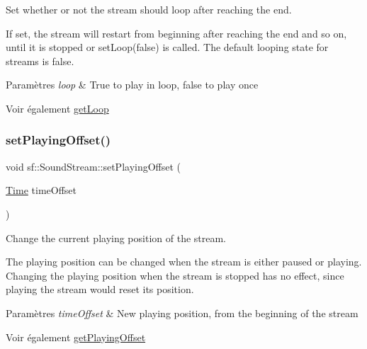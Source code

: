 Set whether or not the stream should loop after reaching the end. 

If set, the stream will restart from beginning after reaching the end and so on, until it is stopped or set\+Loop(false) is called. The default looping state for streams is false.


\begin{DoxyParams}{Paramètres}
{\em loop} & True to play in loop, false to play once\\
\hline
\end{DoxyParams}
\begin{DoxySeeAlso}{Voir également}
\hyperlink{classsf_1_1SoundStream_a49d263f9bbaefec4b019bd05fda59b25}{get\+Loop} 
\end{DoxySeeAlso}
\mbox{\label{classsf_1_1SoundStream_af416a5f84c8750d2acb9821d78bc8646}} 
\subsubsection{\texorpdfstring{set\+Playing\+Offset()}{setPlayingOffset()}}
{\footnotesize\ttfamily void sf\+::\+Sound\+Stream\+::set\+Playing\+Offset (\begin{DoxyParamCaption}\item[{\hyperlink{classsf_1_1Time}{Time}}]{time\+Offset }\end{DoxyParamCaption})}



Change the current playing position of the stream. 

The playing position can be changed when the stream is either paused or playing. Changing the playing position when the stream is stopped has no effect, since playing the stream would reset its position.


\begin{DoxyParams}{Paramètres}
{\em time\+Offset} & New playing position, from the beginning of the stream\\
\hline
\end{DoxyParams}
\begin{DoxySeeAlso}{Voir également}
\hyperlink{classsf_1_1SoundStream_ae288f3c72edbad9cc7ee938ce5b907c1}{get\+Playing\+Offset} 
\end{DoxySeeAlso}
\mbox{\label{classsf_1_1SoundStream_a16cc6a0404b32e42c4dce184bb94d0f4}} 
